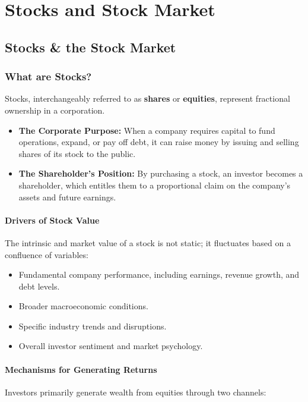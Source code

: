 \documentclass[12pt,openany]{book}
\begin{document}
\section{Stocks and Stock Market}

\subsection{Stocks \& the Stock Market}

\subsubsection{What are Stocks?}
Stocks, interchangeably referred to as \textbf{shares} or \textbf{equities}, represent fractional ownership in a corporation.

\begin{itemize}[leftmargin=*]
    \item \textbf{The Corporate Purpose:} When a company requires capital to fund operations, expand, or pay off debt, it can raise money by issuing and selling shares of its stock to the public.
    \item \textbf{The Shareholder's Position:} By purchasing a stock, an investor becomes a shareholder, which entitles them to a proportional claim on the company's assets and future earnings.
\end{itemize}

\paragraph{Drivers of Stock Value}
The intrinsic and market value of a stock is not static; it fluctuates based on a confluence of variables:

\begin{itemize}[leftmargin=*]
    \item Fundamental company performance, including earnings, revenue growth, and debt levels.
    \item Broader macroeconomic conditions.
    \item Specific industry trends and disruptions.
    \item Overall investor sentiment and market psychology.
\end{itemize}

\paragraph{Mechanisms for Generating Returns}
Investors primarily generate wealth from equities through two channels:
\end{document}
